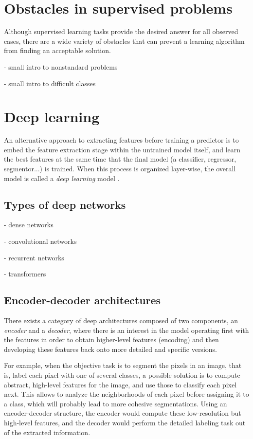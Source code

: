 \section{Obstacles in supervised problems}

Although supervised learning tasks provide the desired answer for all observed cases, there are a wide variety of obstacles that can prevent a learning algorithm from finding an acceptable solution.

- small intro to nonstandard problems



- small intro to difficult classes

\section{Deep learning}

An alternative approach to extracting features before training a predictor 
is to embed the feature extraction stage within the untrained model itself, and learn the best features at the same time that the final model (a classifier, regressor, segmentor...) is trained. When this process is organized layer-wise, the overall model is called a \textit{deep learning} model .

\subsection{Types of deep networks}

- dense networks

- convolutional networks

- recurrent networks

- transformers


\subsection{Encoder-decoder architectures}

There exists a category of deep architectures composed of two components, an \textit{encoder} and a \textit{decoder}, where there is an interest in the model operating first with the features in order to obtain higher-level features (encoding) and then developing these features back onto more detailed and specific versions.

For example, when the objective task is to segment the pixels in an image, that is, label each pixel with one of several classes, a possible solution is to compute abstract, high-level features for the image, and use those to classify each pixel next. This allows to analyze the neighborhoods of each pixel before assigning it to a class, which will probably lead to more cohesive segmentations. Using an encoder-decoder structure, the encoder would compute these low-resolution but high-level features, and the decoder would perform the detailed labeling task out of the extracted information.

